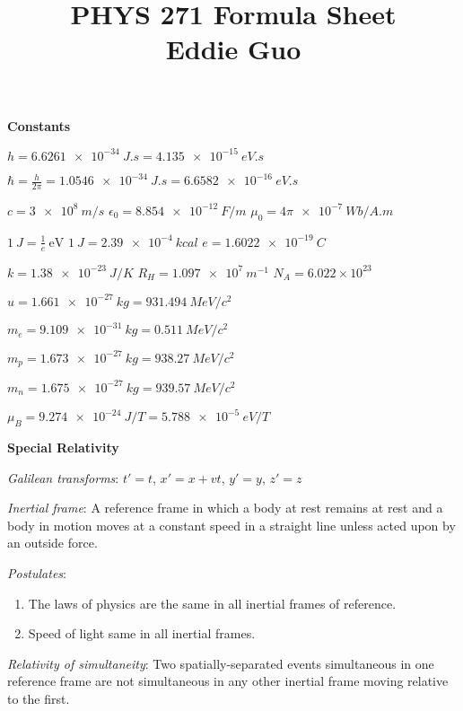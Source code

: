 \documentclass[twocolumn]{article}
\title{
	\vspace{-2em}
	\normalsize \textbf{PHYS 271 Formula Sheet} \\
	\small Eddie Guo \\
	\dotfill
	\vspace{-5em}
}
\date{}
\begin{document}
\maketitle

\small

\textbf{Constants}

$h = \SI{6.6261e-34}{J.s} = \SI{4.135e-15}{eV.s}$

$\hbar = \frac{h}{2\pi} = \SI{1.0546e-34}{J.s} = \SI{6.6582e-16}{eV.s}$

$c = \SI{3e8}{m/s}$ \hfill $\epsilon_0 = \SI{8.854e-12}{F/m}$ \hfill $\mu_0 = 4\pi\SI{e-7}{Wb/A.m}$

$\SI{1}{J} = \frac{1}{e}\ \text{eV}$ \hfill $\SI{1}{J} = \SI{2.39e-4}{kcal}$ \hfill $e = \SI{1.6022e-19}{C}$

$k = \SI{1.38e-23}{J/K}$ \hfill $R_H = \SI{1.097e7}{m^{-1}}$ \hfill $N_A = 6.022 \times 10^{23}$

$u=\SI{1.661e-27}{kg} = \SI{931.494}{MeV/c^2}$

$m_e = \SI{9.109e-31}{kg} = \SI{0.511}{MeV/c^2}$

$m_p = \SI{1.673e-27}{kg} = \SI{938.27}{MeV/c^2}$

$m_n = \SI{1.675e-27}{kg} = \SI{939.57}{MeV/c^2}$

$\mu_B = \SI{9.274e-24}{J/T} = \SI{5.788e-5}{eV/T}$

\vspace{-.5em}
\dotfill

\textbf{Special Relativity}


\textit{Galilean transforms}: $t' = t$, \hfill $x' = x + vt$, \hfill $y' = y$, \hfill $z' = z$

\textit{Inertial frame}: A reference frame in which a body at rest remains at rest and a body in motion moves at a constant speed in a straight line unless acted upon by an outside force.

\textit{Postulates}: \vspace{-1em}

\begin{enumerate}
    \item The laws of physics are the same in all inertial frames of reference.
    \item Speed of light same in all inertial frames.
\end{enumerate} \vspace{-.5em}

\textit{Relativity of simultaneity}: Two spatially-separated events simultaneous in one reference frame are not simultaneous in any other inertial frame moving relative to the first.
\end{document}
